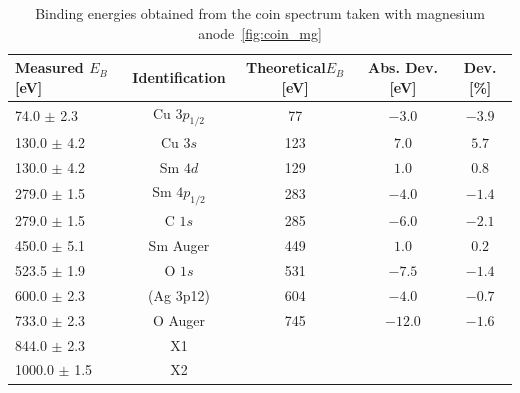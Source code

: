 \documentclass[a4paper,10pt]{scrartcl}
\begin{document}
\begin{table}
\begin{center}
\begin{tabular}{lcccc}
\toprule
Measured $E_{B}$ [eV]      & Identification & Theoretical$E_{B}$ [eV] & Abs. Dev. [eV] & Dev. [\%]\\
\midrule
\phantom{00}74.0 $\pm$ 2.3 & Cu $3p_{1/2}$  & 77                      & $-3.0$         & $-3.9$\\
\phantom{0}130.0 $\pm$ 4.2 & Cu $3s$        & 123                     & $7.0$          & $5.7$ \\
\phantom{0}130.0 $\pm$ 4.2 & Sm $4d$        & 129                     & $1.0$          & $0.8$ \\
\phantom{0}279.0 $\pm$ 1.5 & Sm $4p_{1/2}$  & 283                     & $-4.0$         & $-1.4$\\
\phantom{0}279.0 $\pm$ 1.5 & C $1s$         & 285                     & $-6.0$         & $-2.1$\\
\phantom{0}450.0 $\pm$ 5.1 & Sm Auger       & 449                     & $1.0$          & $0.2$ \\
\phantom{0}523.5 $\pm$ 1.9 & O $1s$         & 531                     & $-7.5$         & $-1.4$\\
\phantom{0}600.0 $\pm$ 2.3 & (Ag 3p12)      & 604                     & $-4.0$         & $-0.7$\\
\phantom{0}733.0 $\pm$ 2.3 & O Auger        & 745                     & $-12.0$        & $-1.6$\\
\phantom{0}844.0 $\pm$ 2.3 & X1             &                         &                &       \\
1000.0 $\pm$ 1.5           & X2             &                         &                &       \\
\bottomrule
\end{tabular}
\end{center}
\par
\caption{Binding energies obtained from the coin spectrum taken with magnesium anode~\ref{fig:coin_mg} \label{tab:coin_mg_ident}}
\end{table}
\end{document}
